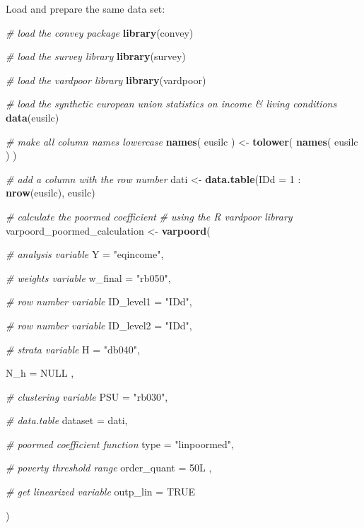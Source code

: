 \documentclass[]{book}
\newenvironment{Shaded}{\begin{snugshade}}{\end{snugshade}}
\newcommand{\KeywordTok}[1]{\textcolor[rgb]{0.13,0.29,0.53}{\textbf{{#1}}}}
\newcommand{\DataTypeTok}[1]{\textcolor[rgb]{0.13,0.29,0.53}{{#1}}}
\newcommand{\DecValTok}[1]{\textcolor[rgb]{0.00,0.00,0.81}{{#1}}}
\newcommand{\StringTok}[1]{\textcolor[rgb]{0.31,0.60,0.02}{{#1}}}
\newcommand{\CommentTok}[1]{\textcolor[rgb]{0.56,0.35,0.01}{\textit{{#1}}}}
\newcommand{\OtherTok}[1]{\textcolor[rgb]{0.56,0.35,0.01}{{#1}}}
\newcommand{\NormalTok}[1]{{#1}}
\begin{document}
Load and prepare the same data set:

\begin{Shaded}
\begin{Highlighting}[]
\CommentTok{# load the convey package}
\KeywordTok{library}\NormalTok{(convey)}

\CommentTok{# load the survey library}
\KeywordTok{library}\NormalTok{(survey)}

\CommentTok{# load the vardpoor library}
\KeywordTok{library}\NormalTok{(vardpoor)}

\CommentTok{# load the synthetic european union statistics on income & living conditions}
\KeywordTok{data}\NormalTok{(eusilc)}

\CommentTok{# make all column names lowercase}
\KeywordTok{names}\NormalTok{( eusilc ) <-}\StringTok{ }\KeywordTok{tolower}\NormalTok{( }\KeywordTok{names}\NormalTok{( eusilc ) )}

\CommentTok{# add a column with the row number}
\NormalTok{dati <-}\StringTok{ }\KeywordTok{data.table}\NormalTok{(}\DataTypeTok{IDd =} \DecValTok{1} \NormalTok{:}\StringTok{ }\KeywordTok{nrow}\NormalTok{(eusilc), eusilc)}

\CommentTok{# calculate the poormed coefficient}
\CommentTok{# using the R vardpoor library}
\NormalTok{varpoord_poormed_calculation <-}
\StringTok{    }\KeywordTok{varpoord}\NormalTok{(}
    
        \CommentTok{# analysis variable}
        \DataTypeTok{Y =} \StringTok{"eqincome"}\NormalTok{, }
        
        \CommentTok{# weights variable}
        \DataTypeTok{w_final =} \StringTok{"rb050"}\NormalTok{,}
        
        \CommentTok{# row number variable}
        \DataTypeTok{ID_level1 =} \StringTok{"IDd"}\NormalTok{,}

        \CommentTok{# row number variable}
        \DataTypeTok{ID_level2 =} \StringTok{"IDd"}\NormalTok{,}
                
        \CommentTok{# strata variable}
        \DataTypeTok{H =} \StringTok{"db040"}\NormalTok{, }
        
        \DataTypeTok{N_h =} \OtherTok{NULL} \NormalTok{,}
        
        \CommentTok{# clustering variable}
        \DataTypeTok{PSU =} \StringTok{"rb030"}\NormalTok{, }
        
        \CommentTok{# data.table}
        \DataTypeTok{dataset =} \NormalTok{dati, }
        
        \CommentTok{# poormed coefficient function}
        \DataTypeTok{type =} \StringTok{"linpoormed"}\NormalTok{,}
      
      \CommentTok{# poverty threshold range}
      \DataTypeTok{order_quant =} \NormalTok{50L ,}
      
      \CommentTok{# get linearized variable}
      \DataTypeTok{outp_lin =} \OtherTok{TRUE}
        
    \NormalTok{)}
\end{Highlighting}
\end{Shaded}
\end{document}
